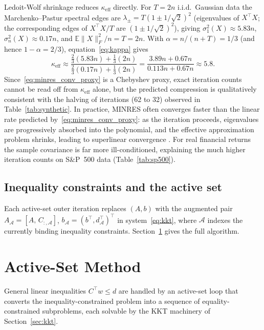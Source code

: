 \documentclass{siam/siamart}
\begin{document}
\begin{remark}\label{rem:marchenko}
Ledoit-Wolf shrinkage reduces $\kappa_{\mathrm{eff}}$ directly.  For $T = 2n$
i.i.d.\ Gaussian data the Marchenko--Pastur spectral edges are
$\lambda_\pm = T(1 \pm 1/\sqrt{2})^2$ (eigenvalues of $X^\top X$; the corresponding
edges of $X^\top X/T$ are $(1 \pm 1/\sqrt{2})^2$), giving
$\sigma_1^2(X) \approx 5.83n$, $\sigma_n^2(X) \approx 0.17n$, and
$\mathbb{E}\|X\|_F^2/n = T = 2n$.
With $\alpha = n/(n+T) = 1/3$ (and hence $1-\alpha = 2/3$),
equation~\eqref{eq:kappa} gives
\[
  \kappa_{\mathrm{eff}} \approx
  \frac{\tfrac{2}{3}(5.83n) + \tfrac{1}{3}(2n)}{\tfrac{2}{3}(0.17n) + \tfrac{1}{3}(2n)}
  = \frac{3.89n + 0.67n}{0.113n + 0.67n} \approx 5.8.
\]
Since~\eqref{eq:minres_conv_proxy} is a Chebyshev
proxy, exact iteration counts cannot be read off from $\kappa_{\mathrm{eff}}$ alone,
but the predicted compression is qualitatively consistent with the halving of iterations
(62 to 32) observed in Table~\ref{tab:synthetic}.  In practice, MINRES often converges
faster than the linear rate predicted by~\eqref{eq:minres_conv_proxy}: as the iteration
proceeds, eigenvalues are progressively absorbed into the polynomial, and the effective
approximation problem shrinks, leading to superlinear convergence \cite{simoncini2013}.
For real financial returns the sample covariance is far more ill-conditioned, explaining
the much higher iteration counts on S\&P~500 data (Table~\ref{tab:sp500}).
\end{remark}

\subsection{Inequality constraints and the active set}

Each active-set outer iteration replaces $(A, b)$ with the augmented pair
$A_{\mathcal{A}} = [A,\, C_{:,\mathcal{A}}]$,
$b_{\mathcal{A}} = (b^\top, d_{\mathcal{A}}^\top)^\top$ in system~\eqref{eq:kkt},
where $\mathcal{A}$ indexes the currently binding inequality constraints.
Section~\ref{sec:activeset} gives the full algorithm.

\section{Active-Set Method}\label{sec:activeset}

General linear inequalities $C^\top w \leq d$ are handled by an active-set
loop that converts the inequality-constrained problem into a sequence of
equality-constrained subproblems, each solvable by the KKT machinery of
Section~\ref{sec:kkt}.
\end{document}
